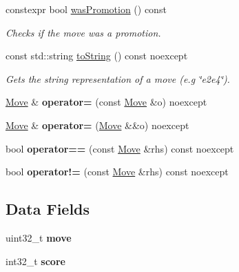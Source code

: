 \begin{DoxyCompactItemize}
constexpr bool \mbox{\hyperlink{classMove_a06483745a13016873fc99db2ea74e042}{was\+Promotion}} () const
\begin{DoxyCompactList}\small\item\em Checks if the move was a promotion. \end{DoxyCompactList}\item 
const std\+::string \mbox{\hyperlink{classMove_a521cf6fe1679a7354ee007037df2da34}{to\+String}} () const noexcept
\begin{DoxyCompactList}\small\item\em Gets the string representation of a move (e.\+g \char`\"{}e2e4\char`\"{}). \end{DoxyCompactList}\item 
\mbox{\label{classMove_a9474c9aae57d49cc2e74dfcd3466a62f}} 
\mbox{\hyperlink{classMove}{Move}} \& {\bfseries operator=} (const \mbox{\hyperlink{classMove}{Move}} \&o) noexcept
\item 
\mbox{\label{classMove_a14f146246c87d23b4b6f8d4853868436}} 
\mbox{\hyperlink{classMove}{Move}} \& {\bfseries operator=} (\mbox{\hyperlink{classMove}{Move}} \&\&o) noexcept
\item 
\mbox{\label{classMove_abe04723add8693b51f92d5f11e5a350a}} 
bool {\bfseries operator==} (const \mbox{\hyperlink{classMove}{Move}} \&rhs) const noexcept
\item 
\mbox{\label{classMove_a1d317f2b6d8bf51a825319f8ceacdd27}} 
bool {\bfseries operator!=} (const \mbox{\hyperlink{classMove}{Move}} \&rhs) const noexcept
\end{DoxyCompactItemize}
\subsection*{Data Fields}
\begin{DoxyCompactItemize}
\item 
\mbox{\label{classMove_a05c0d1c118aaccb4928569c740ecdb5f}} 
uint32\+\_\+t {\bfseries move}
\item 
\mbox{\label{classMove_a910be8d231eabe9a9cd98988f1274538}} 
int32\+\_\+t {\bfseries score}
\end{DoxyCompactItemize}



